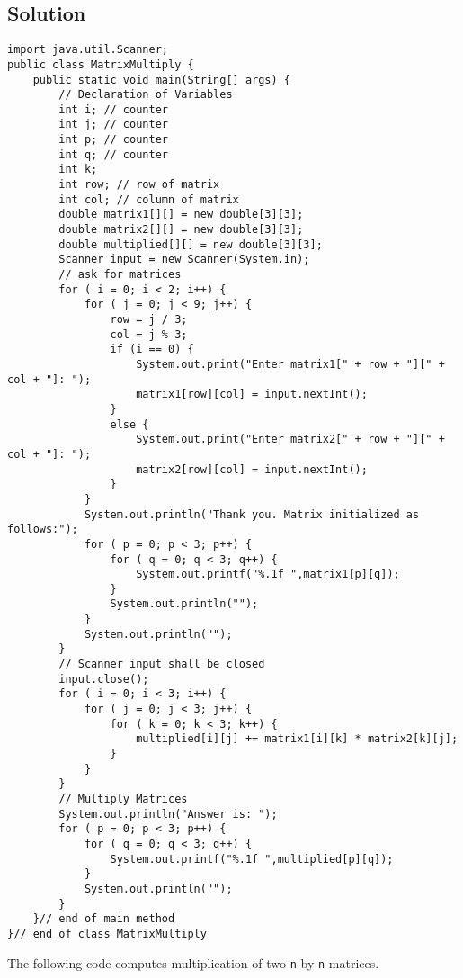 \subsection*{Solution}
\lstset{language=Java,tabsize=2}
\begin{lstlisting}
import java.util.Scanner;
public class MatrixMultiply {
	public static void main(String[] args) {
		// Declaration of Variables
		int i; // counter
		int j; // counter
		int p; // counter
		int q; // counter
		int k;
		int row; // row of matrix
		int col; // column of matrix
		double matrix1[][] = new double[3][3];
		double matrix2[][] = new double[3][3];
		double multiplied[][] = new double[3][3];
		Scanner input = new Scanner(System.in);
		// ask for matrices
		for ( i = 0; i < 2; i++) {
			for ( j = 0; j < 9; j++) {
				row = j / 3;
				col = j % 3;
				if (i == 0) {
					System.out.print("Enter matrix1[" + row + "][" + col + "]: ");
					matrix1[row][col] = input.nextInt();					
				}
				else {
					System.out.print("Enter matrix2[" + row + "][" + col + "]: ");
					matrix2[row][col] = input.nextInt();					
				}
			}
			System.out.println("Thank you. Matrix initialized as follows:");
			for ( p = 0; p < 3; p++) {
				for ( q = 0; q < 3; q++) {
					System.out.printf("%.1f ",matrix1[p][q]);
				}
				System.out.println("");
			}
			System.out.println("");
		}
		// Scanner input shall be closed
		input.close();
		for ( i = 0; i < 3; i++) {
			for ( j = 0; j < 3; j++) {
				for ( k = 0; k < 3; k++) {
					multiplied[i][j] += matrix1[i][k] * matrix2[k][j];
				}
			}
		}
		// Multiply Matrices
		System.out.println("Answer is: ");
		for ( p = 0; p < 3; p++) {
			for ( q = 0; q < 3; q++) {
				System.out.printf("%.1f ",multiplied[p][q]);
			}
			System.out.println("");
		}
	}// end of main method
}// end of class MatrixMultiply
\end{lstlisting}

The following code computes multiplication of two \texttt{n}-by-\texttt{n} matrices.

